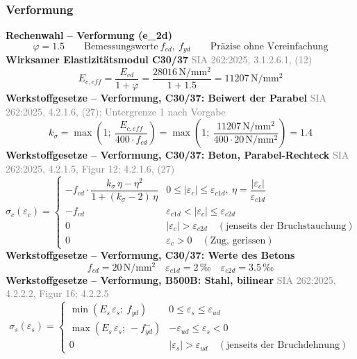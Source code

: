 \documentclass[11pt,a4paper]{article}
\newcommand{\normref}[1]{{\small\textcolor{gray}{#1}}}
\begin{document}
\subsubsection{Verformung}
\noindent\textbf{Rechenwahl – Verformung (e\_2d)}
\begin{equation*}
\varphi = 1.5 \qquad \text{Bemessungswerte}\ f_{cd},\ f_{yd} \qquad \text{Präzise ohne Vereinfachung}
\end{equation*}
\noindent\textbf{Wirksamer Elastizitätsmodul C30/37} \hfill \normref{SIA 262:2025, 3.1.2.6.1, (12)}
\begin{equation*}
E_{c,eff} = \frac{E_{cd}}{1 + \varphi} = \frac{28016\,\mathrm{N}/\mathrm{mm}^{2}}{1 + 1.5} = 11207\,\mathrm{N}/\mathrm{mm}^{2}
\end{equation*}
\noindent\textbf{Werkstoffgesetze – Verformung, C30/37: Beiwert der Parabel} \hfill \normref{SIA 262:2025, 4.2.1.6, (27); Untergrenze 1 nach Vorgabe}
\begin{equation*}
k_{\sigma} = \max\left(1;\ \frac{E_{c,eff}}{400 \cdot f_{cd}}\right) = \max\left(1;\ \frac{11207\,\mathrm{N}/\mathrm{mm}^{2}}{400 \cdot 20\,\mathrm{N}/\mathrm{mm}^{2}}\right) = 1.4
\end{equation*}
\noindent\textbf{Werkstoffgesetze – Verformung, C30/37: Beton, Parabel-Rechteck} \hfill \normref{SIA 262:2025, 4.2.1.5, Figur 12; 4.2.1.6, (27)}
\begin{equation*}
\sigma_c(\varepsilon_c) = \begin{cases} -f_{cd} \cdot \dfrac{k_\sigma\,\eta - \eta^2}{1 + (k_\sigma - 2)\,\eta} & 0 \le |\varepsilon_c| \le \varepsilon_{c1d},\ \eta = \dfrac{|\varepsilon_c|}{\varepsilon_{c1d}} \\[2ex] -f_{cd} & \varepsilon_{c1d} < |\varepsilon_c| \le \varepsilon_{c2d} \\[1ex] 0 & |\varepsilon_c| > \varepsilon_{c2d} \quad (\text{jenseits der Bruchstauchung}) \\[1ex] 0 & \varepsilon_c > 0 \quad (\text{Zug, gerissen}) \end{cases}
\end{equation*}
\noindent\textbf{Werkstoffgesetze – Verformung, C30/37: Werte des Betons}
\begin{equation*}
f_{cd} = 20\,\mathrm{N}/\mathrm{mm}^{2} \quad \varepsilon_{c1d} = 2\,\text{‰} \quad \varepsilon_{c2d} = 3.5\,\text{‰}
\end{equation*}
\noindent\textbf{Werkstoffgesetze – Verformung, B500B: Stahl, bilinear} \hfill \normref{SIA 262:2025, 4.2.2.2, Figur 16; 4.2.2.5}
\begin{equation*}
\sigma_s(\varepsilon_s) = \begin{cases} \min(E_s\,\varepsilon_s;\ f_{yd}) & 0 \le \varepsilon_s \le \varepsilon_{ud} \\[1ex] \max(E_s\,\varepsilon_s;\ -f_{yd}^{-}) & -\varepsilon_{ud} \le \varepsilon_s < 0 \\[1ex] 0 & |\varepsilon_s| > \varepsilon_{ud} \quad (\text{jenseits der Bruchdehnung}) \end{cases}
\end{equation*}
\end{document}
